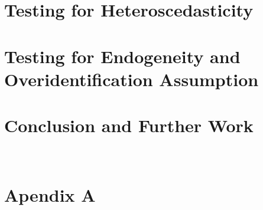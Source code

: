 \documentclass{article}
\begin{document}
\section{Testing for Heteroscedasticity}
\section{Testing for Endogeneity and Overidentification Assumption}
\section{Conclusion and Further Work}

\section*{\\Apendix A}
\end{document}
